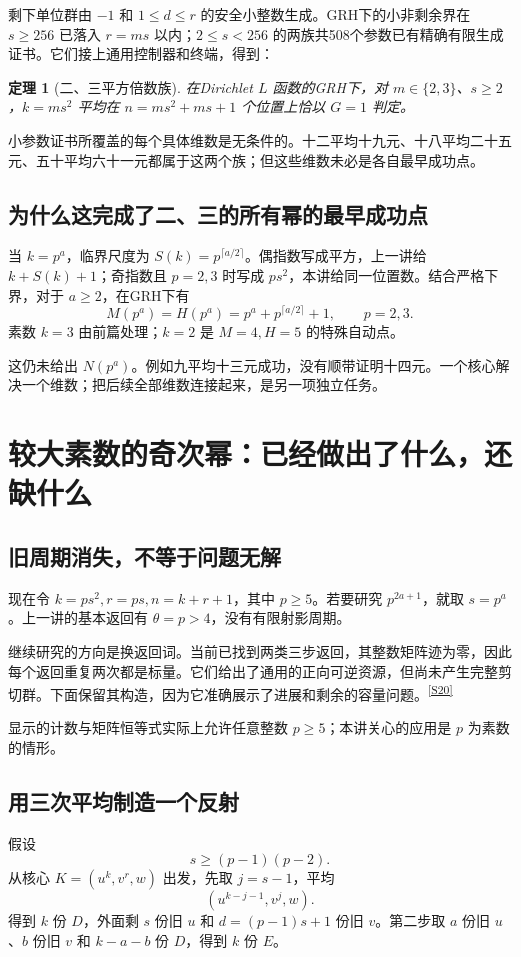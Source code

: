 \documentclass[11pt,a4paper,oneside,openany]{book}
\newcommand{\src}[1]{\textsuperscript{\hyperref[source:#1]{[#1]}}}
\newtheorem{theorem}{定理}[chapter]
\theoremstyle{definition}\newtheorem{example}[theorem]{例}\newtheorem{conjecture}[theorem]{猜想}
\numberwithin{equation}{chapter}\setcounter{tocdepth}{1}
\begin{document}
剩下单位群由 $-1$ 和 $1\le d\le r$ 的安全小整数生成。GRH下的小非剩余界在 $s\ge256$ 已落入 $r=ms$ 以内；$2\le s<256$ 的两族共508个参数已有精确有限生成证书。它们接上通用控制器和终端，得到：
\begin{theorem}[二、三平方倍数族]
在Dirichlet $L$ 函数的GRH下，对 $m\in\{2,3\}$、$s\ge2$，$k=ms^2$ 平均在 $n=ms^2+ms+1$ 个位置上恰以 $G=1$ 判定。
\end{theorem}
小参数证书所覆盖的每个具体维数是无条件的。十二平均十九元、十八平均二十五元、五十平均六十一元都属于这两个族；但这些维数未必是各自最早成功点。

\section{为什么这完成了二、三的所有幂的最早成功点}
当 $k=p^a$，临界尺度为 $S(k)=p^{\lceil a/2\rceil}$。偶指数写成平方，上一讲给 $k+S(k)+1$；奇指数且 $p=2,3$ 时写成 $ps^2$，本讲给同一位置数。结合严格下界，对于 $a\ge2$，在GRH下有
\[M(p^a)=H(p^a)=p^a+p^{\lceil a/2\rceil}+1,
\qquad p=2,3.
\]
素数 $k=3$ 由前篇处理；$k=2$ 是 $M=4,H=5$ 的特殊自动点。

这仍未给出 $N(p^a)$。例如九平均十三元成功，没有顺带证明十四元。一个核心解决一个维数；把后续全部维数连接起来，是另一项独立任务。


\chapter{较大素数的奇次幂：已经做出了什么，还缺什么}\label{ch:high}
\section{旧周期消失，不等于问题无解}
现在令 $k=ps^2,r=ps,n=k+r+1$，其中 $p\ge5$。若要研究 $p^{2a+1}$，就取 $s=p^a$。上一讲的基本返回有 $\theta=p>4$，没有有限射影周期。

继续研究的方向是换返回词。当前已找到两类三步返回，其整数矩阵迹为零，因此每个返回重复两次都是标量。它们给出了通用的正向可逆资源，但尚未产生完整剪切群。下面保留其构造，因为它准确展示了进展和剩余的容量问题。\src{S20}

显示的计数与矩阵恒等式实际上允许任意整数 $p\ge5$；本讲关心的应用是 $p$ 为素数的情形。

\section{用三次平均制造一个反射}
假设
\[s\ge(p-1)(p-2).
\]
从核心 $K=(u^k,v^r,w)$ 出发，先取 $j=s-1$，平均
\[(u^{k-j-1},v^j,w).
\]
得到 $k$ 份 $D$，外面剩 $s$ 份旧 $u$ 和 $d=(p-1)s+1$ 份旧 $v$。第二步取 $a$ 份旧 $u$、$b$ 份旧 $v$ 和 $k-a-b$ 份 $D$，得到 $k$ 份 $E$。
\end{document}
